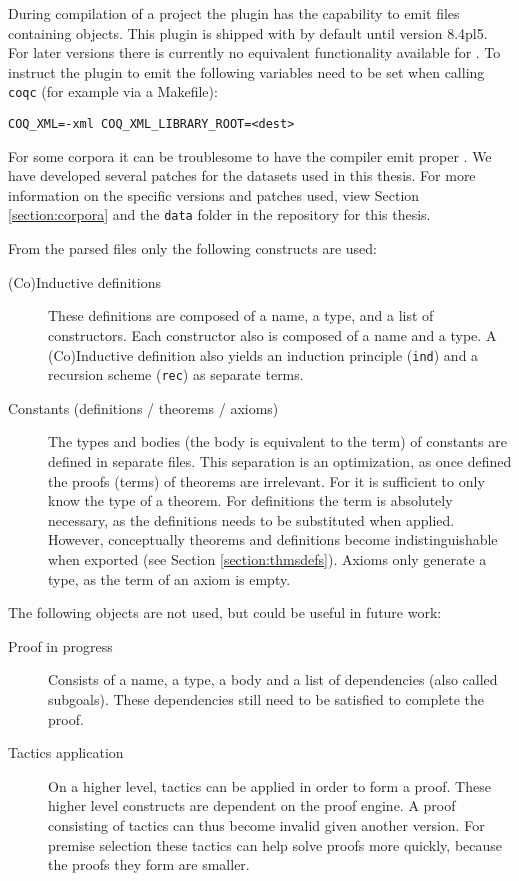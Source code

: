 During compilation of a \coq project the \xml plugin has the capability to emit \xml files containing \acic objects.
This plugin is shipped with \coq by default until version 8.4pl5.
For later versions there is currently no equivalent functionality available for \coq.
To instruct the plugin to emit \xml the following variables need to be set when calling \texttt{coqc} (for example via a Makefile):
\begin{center}
	\lstinline{COQ_XML=-xml COQ_XML_LIBRARY_ROOT=<dest>}
\end{center}

For some corpora it can be troublesome to have the compiler emit proper \xml.
We have developed several patches for the datasets used in this thesis.
For more information on the specific versions and patches used,
view Section \ref{section:corpora} and the \texttt{data} folder in the repository for this thesis.

From the parsed \xml files only the following \acic constructs are used:
\begin{description}
    \item[(Co)Inductive definitions]
        These definitions are composed of a name, a type, and a list of constructors.
        Each constructor also is composed of a name and a type.
		A (Co)Inductive definition also yields an induction principle (\texttt{ind}) and a recursion scheme (\texttt{rec}) as separate terms.
    \item[Constants (definitions / theorems / axioms)]
		The types and bodies (the body is equivalent to the \acic term) of constants are defined in separate \xml files.
		This separation is an optimization, as once defined the proofs (terms) of theorems are irrelevant.
		For \coq it is sufficient to only know the type of a theorem.
		For definitions the term is absolutely necessary, as the definitions needs to be substituted when applied.
		However, conceptually theorems and definitions become indistinguishable when exported (see Section \ref{section:thmsdefs}).
        Axioms only generate a type, as the term of an axiom is empty.
\end{description}

The following objects are not used, but could be useful in future work:
\begin{description}
    \item[Proof in progress]
		Consists of a name, a type, a body and a list of dependencies (also called subgoals).
        These dependencies still need to be satisfied to complete the proof.
    \item[Tactics application]
        On a higher level, tactics can be applied in order to form a proof.
        These higher level constructs are dependent on the proof engine.
        A proof consisting of tactics can thus become invalid given another \coq version.
        For premise selection these tactics can help solve proofs more quickly, because the proofs they form are smaller.
\end{description}

